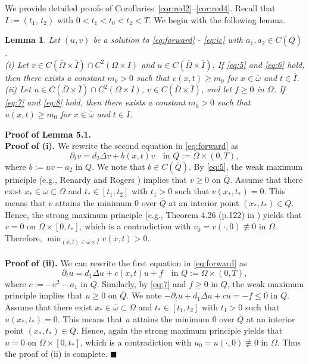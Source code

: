 \documentclass[12pt]{amsart}
\theoremstyle{plain}
\newtheorem{lemma}{Lemma}[section]
\theoremstyle{definition}
\theoremstyle{remark}
\newcommand{\ppp}{\partial}
\newcommand{\ooo}{\overline}
\newcommand{\OOO}{\Omega}
\begin{document}
We provide detailed proofs of 
Corollaries~\ref{cor:red2}--\ref{cor:red4}. Recall that $I:= (t_1, \, t_2)$ with $0<t_1<t_0<t_2 < T$. We begin with the following lemma.
\begin{lemma}
\label{lem:pos}
Let $(u,v)$ be a solution to \eqref{eq:forward} - \eqref{eq:ic} with $a_1, a_2 \in C(\ooo{Q})$.
\\
(i) Let $v \in C(\ooo\OOO \times \ooo{I}) \cap C^2(\OOO \times I)$ and 
$u \in C(\ooo\OOO \times \ooo{I})$.
If \eqref{eq:5} and \eqref{eq:6} hold, then there exists a constant $m_0 > 0$ such that 
$v(x,t) \ge m_0$ for $x \in \ooo{\omega}$ and $t \in \ooo{I}$.
\\
(ii) Let $u \in C(\ooo\OOO \times \ooo{I}) \cap C^2(\OOO \times I)$,
$v \in C(\ooo\OOO \times \ooo{I})$, and let $f \ge 0$ in $\OOO$.
If \eqref{eq:7} and \eqref{eq:8} hold, then there exists a constant $m_0 > 0$ such that 
$u(x,t) \ge m_0$ for $x \in \ooo{\omega}$ and $t \in \ooo{I}$.
\end{lemma}
{\bf Proof of Lemma 5.1.}
\\
{\bf Proof of (i).}
We rewrite the second equation in \eqref{eq:forward} as 
$$
\ppp_tv = d_2\Delta v + b(x,t)v \quad \text{in } Q:= \OOO\times (0,T),
$$
where $b:= uv - a_2$ in $Q$. We note that $b \in C(\ooo{Q})$.
By  \eqref{eq:5}, the weak maximum principle (e.g., Renardy and Rogers \cite{RR})
implies that $v\ge 0$ on $\ooo{Q}$.
Assume that there exist $x_*\in \ooo{\omega} \subset \OOO$ and 
$t_* \in [t_1,t_2]$ with $t_1 > 0$ such that 
$v(x_*,t_*) = 0$.
This means that $v$ attains the minimum $0$ over $\ooo{Q}$ 
at an interior point $(x_*,t_*) \in Q$. Hence, the strong maximum principle
(e.g., Theorem 4.26 (p.122) in \cite{RR}) yields that 
$v = 0$ on $\ooo{\OOO} \times [0,t_*]$, which is a contradiction with 
$v_0 = v(\cdot,0) \not\equiv 0$ in $\OOO$.
Therefore, $\min_{(x,t) \in \ooo{\omega} \times \ooo{I}} v(x,t) > 0$.
\\
\\
{\bf Proof of (ii).}
We can rewrite the first equation in \eqref{eq:forward} as 
$$
\ppp_tu = d_1\Delta u + c(x,t)u + f \quad \text{in } Q:= \OOO\times (0,T),
$$
where $c:= -v^2 - a_1$ in $Q$. Similarly, by \eqref{eq:7} and $f \ge 0$ in $Q$,
the weak maximum principle implies that $u\ge 0$ on $\ooo{Q}$.
We note $-\ppp_tu + d_1\Delta u + cu = -f \le 0$ in $Q$.
Assume that there exist $x_*\in \ooo{\omega} \subset \OOO$ and 
$t_* \in [t_1,t_2]$ with $t_1 > 0$ such that 
$u(x_*,t_*) = 0$.
This means that $u$ attains the minimum $0$ over $\ooo{Q}$ 
at an interior point $(x_*,t_*) \in Q$. Hence, again 
the strong maximum principle yields that 
$u = 0$ on $\ooo{\OOO} \times [0,t_*]$, which is a contradiction with 
$u_0 = u(\cdot,0) \not\equiv 0$ in $\OOO$.
Thus the proof of (ii) is complete.
 $\blacksquare$ 
\end{document}
